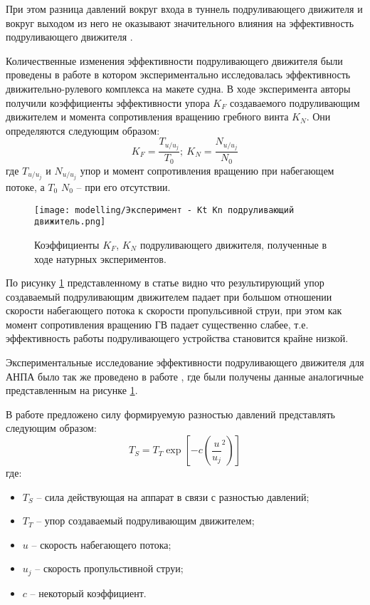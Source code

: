 При этом разница давлений вокруг входа в туннель подруливающего движителя и вокруг выходом из него не оказывают значительного влияния на эффективность подруливающего движителя \cite{brix1973lateral}.

Количественные изменения эффективности подруливающего движителя были проведены в работе \cite{chislett1966influence} в котором экспериментально исследовалась эффективность движительно-рулевого комплекса на макете судна.
В ходе эксперимента авторы получили коэффициенты эффективности упора $K_F$ создаваемого подруливающим движителем и момента сопротивления вращению гребного винта $K_N$.
Они определяются следующим образом:
\begin{equation*}
	K_F = \frac{T_{u/u_j}}{T_0}; \: K_N = \frac{N_{u/u_j}}{N_0}
\end{equation*}
\noindent где $T_{u/u_j}$ и $N_{u/u_j}$ упор и момент сопротивления вращению при набегающем потоке, а $T_0$ $N_0$ -- при его отсутствии.

\begin{figure}[ht]
    \centering
    \texttt{[image: modelling/Эксперимент - Kt Kn подруливающий движитель.png]}
    \caption{Коэффициенты $K_F$, $K_N$ подруливающего движителя, полученные в ходе натурных экспериментов.}
    \label{fig:tunnel_effectivness}
\end{figure}

По рисунку \ref{fig:tunnel_effectivness} представленному в статье \cite{chislett1966influence} видно что результирующий упор создаваемый подруливающим движителем падает при большом отношении скорости набегающего потока к скорости пропульсивной струи, при этом как момент сопротивления вращению ГВ падает существенно слабее, т.е. эффективность работы подруливающего устройства становится крайне низкой.

Экспериментальные исследование эффективности подруливающего движителя для АНПА было так же проведено в работе \cite{beveridge1972design}, где были получены данные аналогичные представленным на рисунке \ref{fig:tunnel_effectivness}.

В работе \cite{palmer2009analysis} предложено силу формируемую разностью давлений представлять следующим образом:
\begin{equation}
    \label{eq:thrust_tunnel}
	T_S = T_T \exp \left[ -c \left( \frac{u}{u_j}^2 \right) \right]
\end{equation}
\noindent где:
\begin{itemize}
	\item $T_S$ -- сила действующая на аппарат в связи с разностью давлений;
	\item $T_T$ -- упор создаваемый подруливающим движителем;
	\item $u$ -- скорость набегающего потока;
	\item $u_j$ -- скорость пропульстивной струи;
	\item $c$ -- некоторый коэффициент.
\end{itemize}

